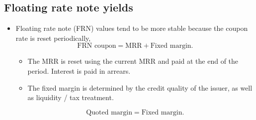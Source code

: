 \documentclass[../notes_compiled.tex]{subfiles}
\begin{document}
\subsection{Floating rate note yields}
\begin{itemize}
\item Floating rate note (FRN) values tend to be more stable because the coupon rate is reset periodically,
\begin{equation}
\text{FRN coupon} = \text{MRR} + \text{Fixed margin}.
\end{equation}
\begin{itemize}
\item The MRR is reset using the current MRR and paid at the end of the period. Interest is paid in arrears.
\item The fixed margin is determined by the credit quality of the issuer, as well as liquidity / tax treatment.
\end{itemize}
\begin{equation}
\text{Quoted margin} = \text{Fixed margin}.
\end{equation}
\end{itemize}
\end{document}
